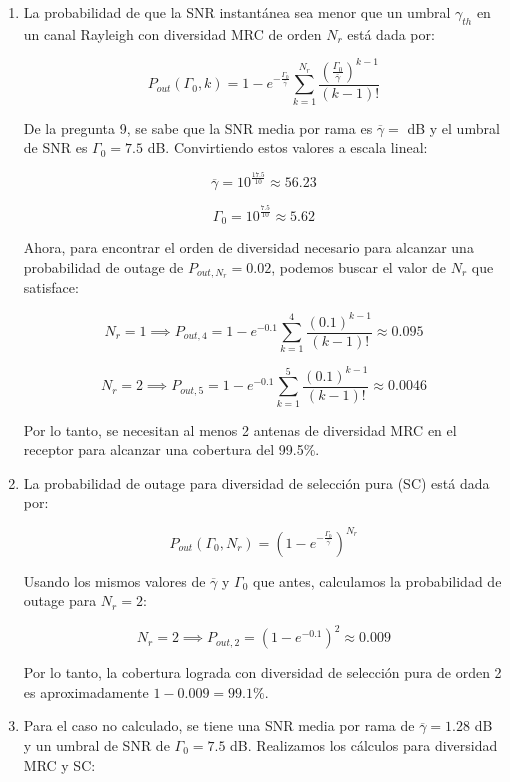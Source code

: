 \documentclass[11pt]{article}
\begin{document}
\begin{enumerate}
    \item La probabilidad de que la SNR instantánea sea menor que un umbral $\gamma_{th}$ en un canal Rayleigh con diversidad MRC de orden $N_r$ está dada por:

    \[
    P_{out}(\Gamma_0, k) = 1 - e^{-\frac{\Gamma_{0}}{\overline{\gamma}}} \sum_{k=1}^{N_r} \frac{\left(\frac{\Gamma_{0}}{\overline{\gamma}} \right)^{k-1}}{\left(k - 1\right)!}
    \]

    De la pregunta 9, se sabe que la SNR media por rama es $\overline{\gamma} = $ dB y el umbral de SNR es $\Gamma_0 = 7.5$ dB. Convirtiendo estos valores a escala lineal:

    \[
    \overline{\gamma} = 10^{\frac{17.5}{10}} \approx 56.23
    \]

    \[
    \Gamma_0 = 10^{\frac{7.5}{10}} \approx 5.62
    \]

    Ahora, para encontrar el orden de diversidad necesario para alcanzar una probabilidad de outage de $P_{out, N_r} = 0.02$, podemos buscar el valor de $N_r$ que satisface:

    \[
    N_r = 1 \implies P_{out, 4} = 1 - e^{-0.1} \sum_{k=1}^{4} \frac{(0.1)^{k-1}}{(k - 1)!} \approx 0.095
    \]

    \[
    N_r = 2 \implies P_{out, 5} = 1 - e^{-0.1} \sum_{k=1}^{5} \frac{(0.1)^{k-1}}{(k - 1)!} \approx 0.0046
    \]

    Por lo tanto, se necesitan al menos 2 antenas de diversidad MRC en el receptor para alcanzar una cobertura del 99.5\%.

    \item La probabilidad de outage para diversidad de selección pura (SC) está dada por:
    
    \[
    P_{out}(\Gamma_0, N_r) = \left(1 - e^{-\frac{\Gamma_{0}}{\overline{\gamma}}}\right)^{N_r}
    \]

    Usando los mismos valores de $\overline{\gamma}$ y $\Gamma_0$ que antes, calculamos la probabilidad de outage para $N_r = 2$:

    \[
    N_r = 2 \implies P_{out, 2} = \left(1 - e^{-0.1}\right)^{2} \approx 0.009
    \]

    Por lo tanto, la cobertura lograda con diversidad de selección pura de orden 2 es aproximadamente $1 - 0.009 = 99.1\%$.

    \item Para el caso no calculado, se tiene una SNR media por rama de $\overline{\gamma} = 1.28$ dB y un umbral de SNR de $\Gamma_0 = 7.5$ dB. Realizamos los cálculos para diversidad MRC y SC:
    

\end{enumerate}
\end{document}
